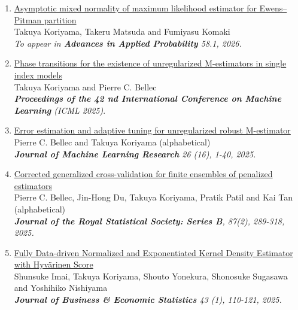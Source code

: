 \documentclass[10pt]{amsart}
\begin{document}
\begin{enumerate}
  \item \href{https://arxiv.org/abs/2207.01949}
  {Asymptotic mixed normality of maximum likelihood estimator for Ewens--Pitman partition}\\
  Takuya Koriyama, Takeru Matsuda and Fumiyasu Komaki\\
  \textit{To appear in \textbf{Advances in Applied Probability} 58.1, 2026.}

  \item \href{https://arxiv.org/abs/2501.03163}{Phase transitions for the existence of unregularized M-estimators in single index models} \\
  Takuya Koriyama and Pierre C. Bellec\\
  \textit{\textbf{Proceedings of the 42 nd International Conference on Machine
Learning} (ICML 2025)}.

  \item \href{https://jmlr.org/papers/v26/24-0060.html}{Error estimation and adaptive tuning for unregularized robust M-estimator}\\
  Pierre C. Bellec and Takuya Koriyama (alphabetical)\\
  \textit{\textbf{Journal of Machine Learning Research}  26 (16), 1-40, 2025.} 

  \item \href{https://doi.org/10.1093/jrsssb/qkae092}{Corrected generalized cross-validation for finite ensembles of penalized estimators}\\
  Pierre C. Bellec, Jin-Hong Du, Takuya Koriyama, Pratik Patil and Kai Tan (alphabetical)\\
  \textit{\textbf{Journal of the Royal Statistical Society: Series B}, 87(2), 289-318, 2025.} 

  \item  \href{https://www.tandfonline.com/doi/full/10.1080/07350015.2024.2326149?casa_token=_YOXJFqGXa0AAAAA%3AZCueJ9QbEp0N1Yvh8Bm0ieEefDcQECfZyzYWfPd2KTI_yxy9l7rt0cja6c5I4cyVJuAT7q2sfTzo}{Fully Data-driven Normalized and Exponentiated Kernel Density Estimator with Hyvärinen Score}\\
  Shunsuke Imai, Takuya Koriyama, Shouto Yonekura, Shonosuke Sugasawa and Yoshihiko Nishiyama\\
  \textit{\textbf{Journal of Business \& Economic Statistics} 43 (1), 110-121, 2025.
  }
\end{enumerate}

\end{document}
